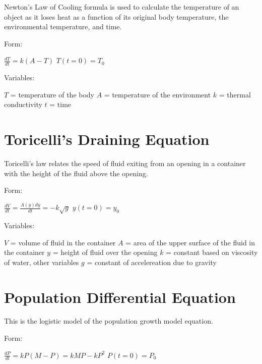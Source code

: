 \documentclass[12 pt, oneside]{book}
\begin{document}
Newton's Law of Cooling formula is used to calculate the temperature of an object as it loses heat as a function of its original body temperature, the environmental temperature, and time.

Form:
\begin{mathline}
  $\frac{dT}{dt}=k(A-T)$\newline{}
  $T(t=0)=T_0$
\end{mathline}

Variables:
\begin{mathline}
  $T$ = temperature of the body\newline{}
  $A$ = temperature of the environment\newline{}
  $k$ = thermal conductivity\newline{}
  $t$ = time
\end{mathline}

\section{Toricelli's Draining Equation}
Toricelli's law relates the speed of fluid exiting from an opening in a container with the height of the fluid above the opening.

Form:
\begin{mathline}
  $\frac{dV}{dt}=\frac{A(y)dy}{dt}=-k\sqrt{g}$\newline{}
  $y(t=0)=y_0$
\end{mathline}

Variables:
\begin{mathline}
$V$ = volume of fluid in the container\newline{}
$A$ = area of the upper surface of the fluid in the container\newline{} 
$y$ = height of fluid over the opening\newline{}
$k$ = constant based on viscosity of water, other variables\newline{}
$g$ = constant of accelereation due to gravity
\end{mathline}

\section{Population Differential Equation}
This is the logistic model of the population growth model equation.

Form:
\begin{mathline}
  $\frac{dP}{dt}=kP(M-P)=kMP-kP^2$\newline{}
  $P(t=0)=P_0$
\end{mathline}
\end{document}

